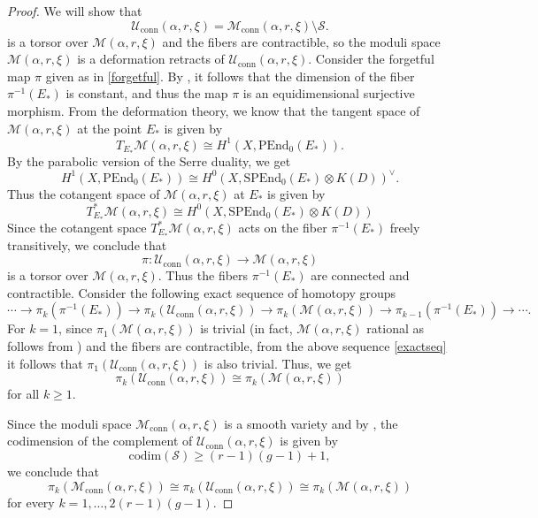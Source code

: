 \documentclass[11pt, reqno]{amsart}
\numberwithin{equation}{section}
\theoremstyle{definition}
\begin{document}
	\begin{proof}
	 We will show that
		\[
		\mathcal{U}_{\mathrm{conn}}(\alpha, r, \xi) = \mathcal{M}_{\mathrm{conn}}(\alpha, r, \xi) \setminus \mathcal{S}.
		\]
		 is a torsor over $\mathcal{M}(\alpha, r, \xi)$ and the fibers are contractible, so the moduli space $\mathcal{M}(\alpha, r, \xi)$ is a deformation retracts of $\mathcal{U}_{\mathrm{conn}}(\alpha, r, \xi)$. Consider the forgetful map $\pi$ given as in \eqref{forgetful}. By , it follows that the dimension of the fiber $\pi^{-1}(E_*)$ is constant, and thus the map $\pi$ is an equidimensional surjective morphism. From the deformation theory, we know that the tangent space of $\mathcal{M}(\alpha, r, \xi)$ at the point $E_*$ is given by
  \[
  T_{E_*}\mathcal{M}(\alpha, r, \xi) \cong H^1(X, \mathrm{PEnd}_0(E_*)).
  \]
By the parabolic version of the Serre duality, we get
  \[
  H^1(X, \mathrm{PEnd}_0(E_*)) \cong H^0(X, \mathrm{SPEnd}_0(E_*) \otimes K(D))^\vee.
  \]
  Thus the cotangent space of $\mathcal{M}(\alpha, r, \xi)$ at $E_*$ is given by 
  \[
  T^*_{E_*}\mathcal{M}(\alpha, r, \xi) \cong H^0(X, \mathrm{SPEnd}_0(E_*) \otimes K(D))
  \]
  Since the cotangent space $T^*_{E_*}\mathcal{M}(\alpha, r, \xi)$ acts on the fiber $\pi^{-1}(E_*)$ freely transitively, we conclude that $$ \pi : \mathcal{U}_{\mathrm{conn}}(\alpha, r, \xi) \longrightarrow \mathcal{M}(\alpha, r, \xi)$$ is a torsor over $\mathcal{M}(\alpha, r, \xi)$. Thus the fibers $\pi^{-1}(E_*)$ are connected and contractible. Consider the following exact sequence of homotopy groups
  \begin{equation}\label{exactseq}
  \cdots \rightarrow \pi_k(\pi^{-1}(E_*)) \rightarrow  \pi_k(\mathcal{U}_{\mathrm{conn}}(\alpha, r, \xi)) \rightarrow \pi_k(\mathcal{M}(\alpha, r, \xi)) \rightarrow   \pi_{k-1}(\pi^{-1}(E_*)) \rightarrow \cdots. 
  \end{equation}
 For $k=1$, since $\pi_1(\mathcal{M}(\alpha, r, \xi))$ is trivial (in fact, $\mathcal{M}(\alpha, r, \xi)$ rational as follows from \cite{BY99}) and the fibers are contractible, from the above sequence \eqref{exactseq} it follows that $\pi_1(\mathcal{U}_{\mathrm{conn}}(\alpha, r, \xi)) $ is also trivial. Thus, we get
  \[
    \pi_k(\mathcal{U}_{\mathrm{conn}}(\alpha, r, \xi)) \cong \pi_k(\mathcal{M}(\alpha, r, \xi))
  \]
  for all $k\geq 1$.

  Since the moduli space $\mathcal{M}_{\mathrm{conn}}(\alpha, r, \xi)$ is a smooth variety and by  , the codimension of the complement of $\mathcal{U}_{\mathrm{conn}}(\alpha, r, \xi)$ is given by $$\mathrm{codim}(\mathcal{S}) \geq (r-1)(g-1)+1,$$ we conclude that
  \[
  \pi_k(\mathcal{M}_{\mathrm{conn}}(\alpha, r, \xi)) \cong \pi_k(\mathcal{U}_{\mathrm{conn}}(\alpha, r, \xi)) \cong \pi_k(\mathcal{M}(\alpha, r, \xi))
  \]
  for every $k=1,\dots ,2(r-1)(g-1)$. 
\end{proof}
\end{document}
